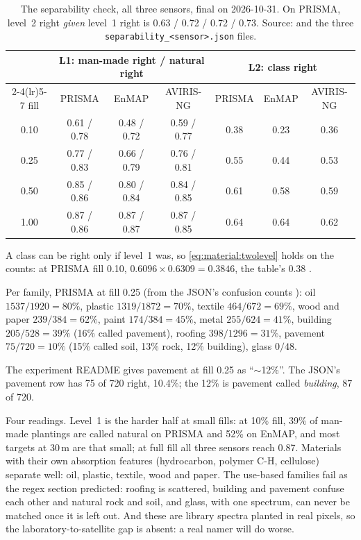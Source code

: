 \begin{table}[htbp]
\centering\small
\begin{tabular}{ccccccc}
\toprule
 & \multicolumn{3}{c}{L1: man-made right / natural right} & \multicolumn{3}{c}{L2: class right}\\
\cmidrule(lr){2-4}\cmidrule(lr){5-7}
fill & PRISMA & EnMAP & AVIRIS-NG & PRISMA & EnMAP & AVIRIS-NG\\
\midrule
0.10 & 0.61 / 0.78 & 0.48 / 0.72 & 0.59 / 0.77 & 0.38 & 0.23 & 0.36\\
0.25 & 0.77 / 0.83 & 0.66 / 0.79 & 0.76 / 0.81 & 0.55 & 0.44 & 0.53\\
0.50 & 0.85 / 0.86 & 0.80 / 0.84 & 0.84 / 0.85 & 0.61 & 0.58 & 0.59\\
1.00 & 0.87 / 0.86 & 0.87 / 0.87 & 0.87 / 0.85 & 0.64 & 0.64 & 0.62\\
\bottomrule
\end{tabular}
\caption{The separability check, all three sensors, final on 2026-10-31. On PRISMA, level~2 right \emph{given} level~1
right is 0.63 / 0.72 / 0.72 / 0.73. Source:  and the three
\texttt{separability\_<sensor>.json} files.}
\label{tab:material:separability}
\end{table}

A class can be right only if level~1 was, so \cref{eq:material:twolevel} holds on the counts: at PRISMA fill 0.10,
$0.6096\times0.6309=0.3846$, the table's 0.38 \tagC.

Per family, PRISMA at fill 0.25 (from the JSON's confusion counts \tagC): oil $1537/1920=80\%$, plastic
$1319/1872=70\%$, textile $464/672=69\%$, wood and paper $239/384=62\%$, paint $174/384=45\%$, metal $255/624=41\%$,
building $205/528=39\%$ (16\% called pavement), roofing $398/1296=31\%$, pavement $75/720=10\%$ (15\% called soil,
13\% rock, 12\% building), glass $0/48$.

\begin{sourcenote}
The experiment README gives pavement at fill 0.25 as ``$\sim$12\%''. The JSON's pavement row has 75 of 720 right,
10.4\%; the 12\% is pavement called \emph{building}, 87 of 720.
\end{sourcenote}

Four readings. Level~1 is the harder half at small fills: at 10\% fill, 39\% of man-made plantings are called
natural on PRISMA and 52\% on EnMAP, and most targets at 30\,m are that small; at full fill all three sensors reach
0.87. Materials with their own absorption features (hydrocarbon, polymer C-H, cellulose) separate well: oil,
plastic, textile, wood and paper. The use-based families fail as the regex section predicted: roofing is scattered,
building and pavement confuse each other and natural rock and soil, and glass, with one spectrum, can never be
matched once it is left out. And these are library spectra planted in real pixels, so the laboratory-to-satellite
gap is absent: a real namer will do worse.


